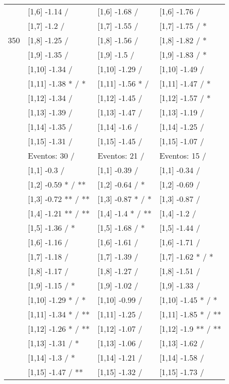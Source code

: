 \begin{table}
\begin{tabular}[t]{llll}
 & {}[1,6] -1.14  / & {}[1,6] -1.68  / & {}[1,6] -1.76  /\\
 & {}[1,7] -1.2  / & {}[1,7] -1.55  / & {}[1,7] -1.75  / *\\
350 & {}[1,8] -1.25  / & {}[1,8] -1.56  / & {}[1,8] -1.82  / *\\
\addlinespace
 & {}[1,9] -1.35  / & {}[1,9] -1.5  / & {}[1,9] -1.83  / *\\
 & {}[1,10] -1.34  / & {}[1,10] -1.29  / & {}[1,10] -1.49  /\\
 & {}[1,11] -1.38 * / * & {}[1,11] -1.56 * / & {}[1,11] -1.47  / *\\
 & {}[1,12] -1.34  / & {}[1,12] -1.45  / & {}[1,12] -1.57  / *\\
 & {}[1,13] -1.39  / & {}[1,13] -1.47  / & {}[1,13] -1.19  /\\
\addlinespace
 & {}[1,14] -1.35  / & {}[1,14] -1.6  / & {}[1,14] -1.25  /\\
 & {}[1,15] -1.31  / & {}[1,15] -1.45  / & {}[1,15] -1.07  /\\
 & Eventos:  30 / & Eventos:  21 / & Eventos:  15 /\\
 & {}[1,1] -0.3  / & {}[1,1] -0.39  / & {}[1,1] -0.34  /\\
 & {}[1,2] -0.59 * / ** & {}[1,2] -0.64  / * & {}[1,2] -0.69  /\\
\addlinespace
 & {}[1,3] -0.72 ** / ** & {}[1,3] -0.87 * / * & {}[1,3] -0.87  /\\
 & {}[1,4] -1.21 ** / ** & {}[1,4] -1.4 * / ** & {}[1,4] -1.2  /\\
 & {}[1,5] -1.36  / * & {}[1,5] -1.68  / * & {}[1,5] -1.44  /\\
 & {}[1,6] -1.16  / & {}[1,6] -1.61  / & {}[1,6] -1.71  /\\
 & {}[1,7] -1.18  / & {}[1,7] -1.39  / & {}[1,7] -1.62 * / *\\
\addlinespace
500 & {}[1,8] -1.17  / & {}[1,8] -1.27  / & {}[1,8] -1.51  /\\
 & {}[1,9] -1.15  / * & {}[1,9] -1.02  / & {}[1,9] -1.33  /\\
 & {}[1,10] -1.29 * / * & {}[1,10] -0.99  / & {}[1,10] -1.45 * / *\\
 & {}[1,11] -1.34 * / ** & {}[1,11] -1.25  / & {}[1,11] -1.85 * / **\\
 & {}[1,12] -1.26 * / ** & {}[1,12] -1.07  / & {}[1,12] -1.9 ** / **\\
\addlinespace
 & {}[1,13] -1.31  / * & {}[1,13] -1.06  / & {}[1,13] -1.62  /\\
 & {}[1,14] -1.3  / * & {}[1,14] -1.21  / & {}[1,14] -1.58  /\\
 & {}[1,15] -1.47  / ** & {}[1,15] -1.32  / & {}[1,15] -1.73  /\\
\bottomrule
\end{tabular}
\end{table}
